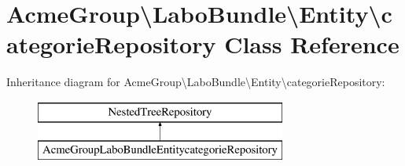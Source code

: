 \hypertarget{class_acme_group_1_1_labo_bundle_1_1_entity_1_1categorie_repository}{\section{Acme\+Group\textbackslash{}Labo\+Bundle\textbackslash{}Entity\textbackslash{}categorie\+Repository Class Reference}
\label{class_acme_group_1_1_labo_bundle_1_1_entity_1_1categorie_repository}
}
Inheritance diagram for Acme\+Group\textbackslash{}Labo\+Bundle\textbackslash{}Entity\textbackslash{}categorie\+Repository\+:\begin{figure}[H]
\begin{center}
\leavevmode
\includegraphics[height=2.000000cm]{class_acme_group_1_1_labo_bundle_1_1_entity_1_1categorie_repository}
\end{center}
\end{figure}
